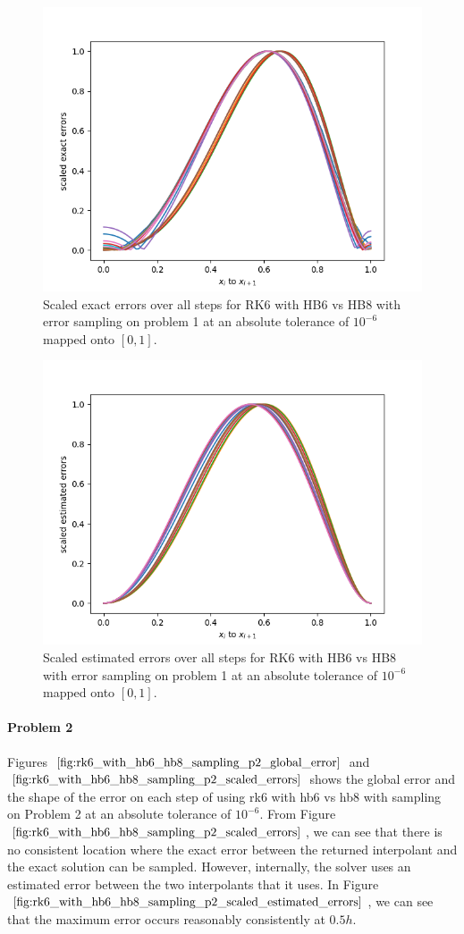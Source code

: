 \begin{figure}[H]
\centering
\includegraphics[width=0.7\linewidth]{./figures/rk6_with_hb6_hb8_sampling_p1_scaled_errors}
\caption{Scaled exact errors over all steps for RK6 with HB6 vs HB8 with error sampling on problem 1 at an absolute tolerance of $10^{-6}$ mapped onto $[0, 1]$.}
\label{fig:rk6_with_hb6_hb8_sampling_p1_scaled_errors}
\end{figure}

\begin{figure}[H]
\centering
\includegraphics[width=0.7\linewidth]{./figures/rk6_with_hb6_hb8_sampling_p1_scaled_estimated_errors}
\caption{Scaled estimated errors over all steps for RK6 with HB6 vs HB8 with error sampling on problem 1 at an absolute tolerance of $10^{-6}$ mapped onto $[0, 1]$.}
\label{fig:rk6_with_hb6_hb8_sampling_p1_scaled_estimated_errors}
\end{figure}


\paragraph{Problem 2} Figures $\ref{fig:rk6_with_hb6_hb8_sampling_p2_global_error}$ and $\ref{fig:rk6_with_hb6_hb8_sampling_p2_scaled_errors}$ shows the global error and the shape of the error on each step of using rk6 with hb6 vs hb8 with sampling on Problem 2 at an absolute tolerance of $10^{-6}$. From Figure $\ref{fig:rk6_with_hb6_hb8_sampling_p2_scaled_errors}$, we can see that there is no consistent location where the exact error between the returned interpolant and the exact solution can be sampled. However, internally, the solver uses an estimated error between the two interpolants that it uses. In Figure $\ref{fig:rk6_with_hb6_hb8_sampling_p2_scaled_estimated_errors}$, we can see that the maximum error occurs reasonably consistently at $0.5h$.


